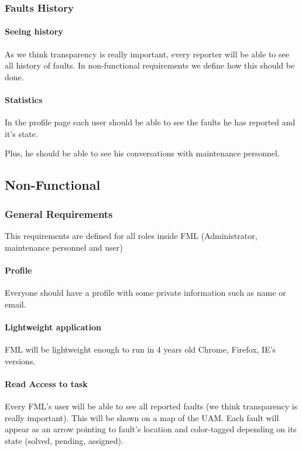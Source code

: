 \subsubsection{Faults History}

\paragraph{Seeing history} As we think transparency is really important, every reporter will be able to see all history of faults. In non-functional requirements we define how this should be done.

\paragraph{Statistics} In the profile page each user should be able to see the faults he has reported and it's state.

Plus, he should be able to see his conversations with maintenance personnel.


\subsection{Non-Functional}

\subsubsection{General Requirements}

This requirements are defined for all roles inside FML (Administrator, maintenance personnel and user)

\paragraph{Profile} Everyone should have a profile with some private information such as name or email.

\paragraph{Lightweight application} FML will be lightweight enough to run in 4 years old Chrome, Firefox, IE's versions.

\paragraph{Read Access to task} Every FML's user will be able to see all reported faults (we think transparency is really important). This will be shown on a map of the UAM. Each fault will appear as an arrow pointing to fault's location and color-tagged depending on its state (solved, pending, assigned).

